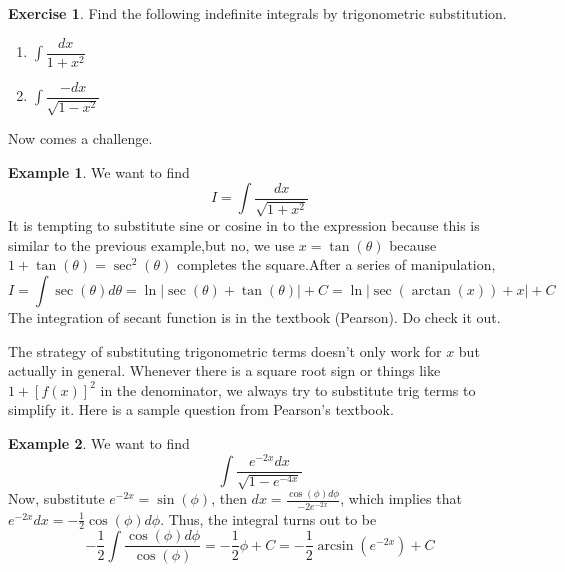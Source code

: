 \documentclass{article}
\theoremstyle{definition}
\theoremstyle{definition}
\theoremstyle{definition}
\theoremstyle{definition}
\theoremstyle{definition}
\theoremstyle{definition}
\newtheorem{example}{Example}
\theoremstyle{definition}
\theoremstyle{definition}
\theoremstyle{definition}
\newtheorem{exercise}{Exercise}
\begin{document}
\begin{exercise}
Find the following indefinite integrals by trigonometric substitution.
\begin{enumerate}
	\item $\int \dfrac{dx}{1+x^2}$
	\item $\int \dfrac{-dx}{\sqrt{1-x^2}}$
\end{enumerate}
\end{exercise}

Now comes a challenge.
\begin{example}
We want to find \[I=\int \dfrac{dx}{\sqrt{1+x^2}}\]
It is tempting to substitute sine or cosine in to the expression because this is similar to the previous example,but no, we use $x=\tan(\theta)$ because $1+\tan(\theta)=\sec^2(\theta)$ completes the square.After a series of manipulation,
\[
I=\int\sec(\theta)d\theta=\ln|\sec(\theta)+\tan(\theta)|+C=\ln|\sec(\arctan(x))+x|+C
\]
The integration of secant function is in the textbook (Pearson). Do check it out.
\end{example}

The strategy of substituting trigonometric terms doesn't only work for $x$ but actually in general. Whenever there is a square root sign or things like $1+[f(x)]^2$ in the denominator, we always try to substitute trig terms to simplify it. Here is a sample question from Pearson's textbook.
\begin{example}
We want to find \[ \int \dfrac{e^{-2x}dx}{\sqrt{1-e^{-4x}}}\]
Now, substitute $e^{-2x}=\sin(\phi)$, then $dx=\frac{\cos(\phi)d\phi}{-2e^{-2x}}$, which implies that $e^{-2x}dx=-\frac{1}{2}\cos(\phi)d\phi$. Thus, the integral turns out to be
\[
-\dfrac{1}{2}\int\dfrac{\cos(\phi)d\phi}{\cos(\phi)}=-\dfrac{1}{2}\phi+C=-\dfrac{1}{2}\arcsin(e^{-2x})+C
\]
\end{example}
\end{document}
